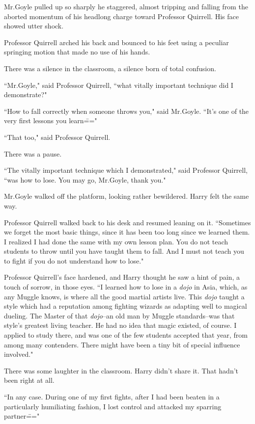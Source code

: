 Mr.\?Goyle pulled up so sharply he staggered, almost tripping and falling from the aborted momentum of his headlong charge toward Professor Quirrell. His face showed utter shock.

Professor Quirrell arched his back and bounced to his feet using a peculiar springing motion that made no use of his hands.

There was a silence in the classroom, a silence born of total confusion.

``Mr.\?Goyle," said Professor Quirrell, ``what vitally important technique did I demonstrate?"

``How to fall correctly when someone throws you," said Mr.\?Goyle. ``It's one of the very first lessons you learn\==="

``That too," said Professor Quirrell.

There was a pause.

``The vitally important technique which I demonstrated," said Professor Quirrell, ``was how to lose. You may go, Mr.\?Goyle, thank you."

Mr.\?Goyle walked off the platform, looking rather bewildered. Harry felt the same way.

Professor Quirrell walked back to his desk and resumed leaning on it. ``Sometimes we forget the most basic things, since it has been too long since we learned them. I realized I had done the same with my own lesson plan. You do not teach students to throw until you have taught them to fall. And I must not teach you to fight if you do not understand how to lose."

Professor Quirrell's face hardened, and Harry thought he saw a hint of pain, a touch of sorrow, in those eyes. ``I learned how to lose in a \emph{dojo} in Asia, which, as any Muggle knows, is where all the good martial artists live. This \emph{dojo} taught a style which had a reputation among fighting wizards as adapting well to magical dueling. The Master of that \emph{dojo}\---an old man by Muggle standards\---was that style's greatest living teacher. He had no idea that magic existed, of course. I applied to study there, and was one of the few students accepted that year, from among many contenders. There might have been a tiny bit of special influence involved."

There was some laughter in the classroom. Harry didn't share it. That hadn't been right at all.

``In any case. During one of my first fights, after I had been beaten in a particularly humiliating fashion, I lost control and attacked my sparring partner\==="


